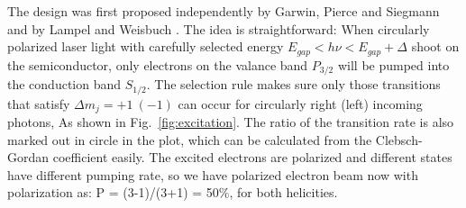 The design was first proposed independently by Garwin, Pierce and Siegmann \cite{GARWIN}
and by Lampel and Weisbuch \cite{LAMPEL1975877}. The idea is straightforward:
When circularly polarized laser light with carefully selected energy $E_{gap} < h\nu < E_{gap} + \Delta$
shoot on the semiconductor, only electrons on the valance band $P_{3/2}$ will be
pumped into the conduction band $S_{1/2}$. The selection rule makes sure only
those transitions that satisfy $\Delta m_j = +1 \ (-1)$ can occur for circularly
right (left) incoming photons, As shown in Fig.~\ref{fig:excitation}.
The ratio of the transition rate is also marked out in circle in the plot, 
which can be calculated from the Clebsch-Gordan coefficient easily. The excited
electrons are polarized and different states have different pumping rate, so
we have polarized electron beam now with polarization as: P = (3-1)/(3+1) = 50\%,
for both helicities.

